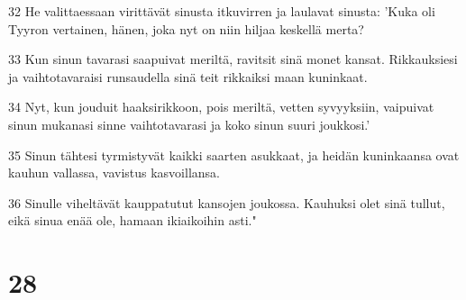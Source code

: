\par 32 He valittaessaan virittävät sinusta itkuvirren ja laulavat sinusta: 'Kuka oli Tyyron vertainen, hänen, joka nyt on niin hiljaa keskellä merta?
\par 33 Kun sinun tavarasi saapuivat meriltä, ravitsit sinä monet kansat. Rikkauksiesi ja vaihtotavaraisi runsaudella sinä teit rikkaiksi maan kuninkaat.
\par 34 Nyt, kun jouduit haaksirikkoon, pois meriltä, vetten syvyyksiin, vaipuivat sinun mukanasi sinne vaihtotavarasi ja koko sinun suuri joukkosi.'
\par 35 Sinun tähtesi tyrmistyvät kaikki saarten asukkaat, ja heidän kuninkaansa ovat kauhun vallassa, vavistus kasvoillansa.
\par 36 Sinulle viheltävät kauppatutut kansojen joukossa. Kauhuksi olet sinä tullut, eikä sinua enää ole, hamaan ikiaikoihin asti."

\chapter{28}

